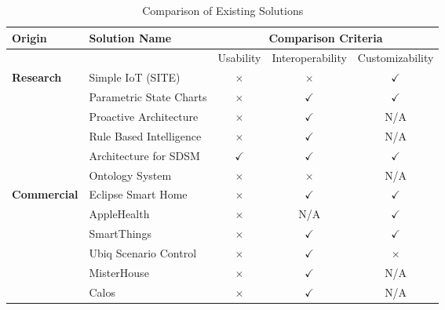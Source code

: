 \begin{table}[h!]
\footnotesize
    \begin{center}
        \begin{tabular}{|p{2cm}|p{3.5cm}|c|c|c|} \hline
        \textbf{Origin} & \textbf{Solution Name} & \multicolumn{3}{|c|}{\textbf{Comparison Criteria}}\\ \hline
        & &Usability & Interoperability &  Customizability \\ \hline
        \multirow{6}{*}{\textbf{Research}} & Simple IoT (SITE) & $\times$ & $\times$ & $\checkmark$ \\ \cline{2-5}
        & Parametric State Charts& $\times$ & $\checkmark$&  $\checkmark$ \\\cline{2-5}
        & Proactive Architecture& $\times$& $\checkmark$ &  N/A \\\cline{2-5}
        & Rule Based Intelligence& $\times$& $\checkmark$ &  N/A \\\cline{2-5}
        &Architecture for SDSM& $\checkmark$& $\checkmark$&  $\checkmark$ \\\cline{2-5}
        &Ontology System& $\times$ &$\times$&  N/A \\
        \hline
        \multirow{6}{*}{\textbf{Commercial}}& Eclipse Smart Home& $\times$& $\checkmark$&  $\checkmark$ \\\cline{2-5}
        &AppleHealth & $\times$ & N/A&  $\checkmark$ \\\cline{2-5}
        &SmartThings &  $\times$&$\checkmark$ &  $\checkmark$ \\\cline{2-5}
        &Ubiq Scenario Control& $\times$ &$\checkmark$ &  $\times$\\\cline{2-5}
        &MisterHouse& $\times$ &$\checkmark$ &  N/A\\\cline{2-5}
        &Calos&$\times$ &$\checkmark$ &  N/A\\
        \hline
        \end{tabular}
    \end{center}
    \caption{Comparison of Existing Solutions}
    \label{tab:compare}
\end{table}